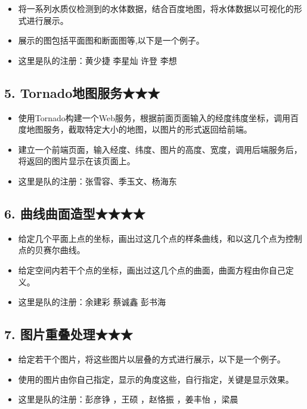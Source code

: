 \documentclass[11pt]{article}
\providecommand{\tightlist}{%
      \setlength{\itemsep}{0pt}\setlength{\parskip}{0pt}}
\begin{document}
\begin{itemize}
\tightlist
\item
  将一系列水质仪检测到的水体数据，结合百度地图，将水体数据以可视化的形式进行展示。
\item
  展示的图包括平面图和断面图等,以下是一个例子。 
\item
  这里是队的注册：黄少捷 李星灿 许登 李想
\end{itemize}

    \subsection{5.
Tornado地图服务★★★}\label{tornadoux5730ux56feux670dux52a1}

\begin{itemize}
\tightlist
\item
  使用Tornado构建一个Web服务，根据前面页面输入的经度纬度坐标，调用百度地图服务，截取特定大小的地图，以图片的形式返回给前端。
\item
  建立一个前端页面，输入经度、纬度、图片的高度、宽度，调用后端服务后，将返回的图片显示在该页面上。
\item
  这里是队的注册：张雪容、季玉文、杨海东
\end{itemize}

    \subsection{6.
曲线曲面造型★★★★}\label{ux66f2ux7ebfux66f2ux9762ux9020ux578b}

\begin{itemize}
\tightlist
\item
  给定几个平面上点的坐标，画出过这几个点的样条曲线，和以这几个点为控制点的贝赛尔曲线。
\item
  给定空间内若干个点的坐标，画出过这几个点的曲面，曲面方程由你自己定义。
\item
  这里是队的注册：余建彩 蔡诚鑫 彭书海
\end{itemize}

    \subsection{7.
图片重叠处理★★★}\label{ux56feux7247ux91cdux53e0ux5904ux7406}

\begin{itemize}
\tightlist
\item
  给定若干个图片，将这些图片以层叠的方式进行展示，以下是一个例子。 
\item
  使用的图片由你自己指定，显示的角度这些，自行指定，关键是显示效果。
\item
  这里是队的注册：彭彦铮 ，王硕 ，赵恪振 ，姜丰怡 ，梁晨
\end{itemize}
\end{document}

